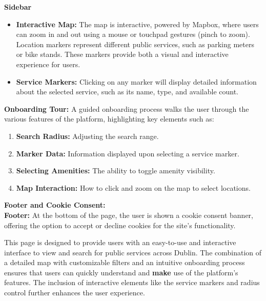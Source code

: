 \textbf{Sidebar}\\
\begin{itemize}
    \item \textbf{Interactive Map:} The map is interactive, powered by Mapbox, where users can zoom in and out using a mouse or touchpad gestures (pinch to zoom). Location markers represent different public services, such as parking meters or bike stands. These markers provide both a visual and interactive experience for users.
    \item \textbf{Service Markers:} Clicking on any marker will display detailed information about the selected service, such as its name, type, and available count.
\end{itemize}
\textbf{Onboarding Tour:}
A guided onboarding process walks the user through the various features of the platform, highlighting key elements such as:
\begin{enumerate}
    \item \textbf{Search Radius:} Adjusting the search range.
    \item \textbf{Marker Data:} Information displayed upon selecting a service marker.
    \item \textbf{Selecting Amenities:} The ability to toggle amenity visibility.
    \item \textbf{Map Interaction:} How  to click and zoom on the map to select locations.
\end{enumerate}
\textbf{Footer and Cookie Consent:}\\
\textbf{Footer:} At the bottom of the page, the user is shown a cookie consent banner, offering the option to accept or decline cookies for the site’s functionality.

This page is designed to provide users with an easy-to-use and interactive interface to view and search for public services across Dublin. The combination of a detailed map with customizable filters and an intuitive onboarding process ensures that users can quickly understand and \textbf{make} use of the platform’s features. The inclusion of interactive elements like the service markers and radius control further enhances the user experience.


\paragraph{}